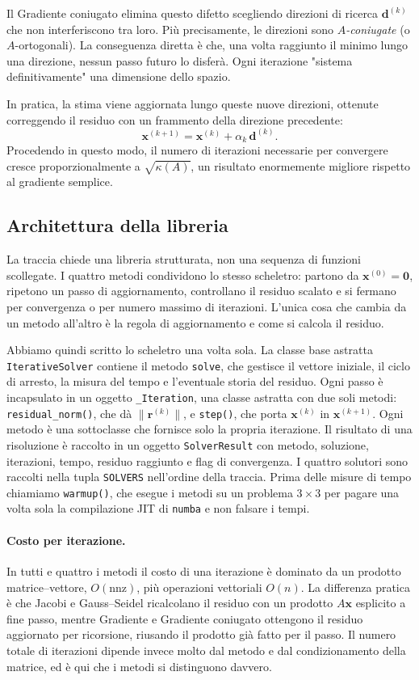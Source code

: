 \documentclass[11pt,a4paper]{article}
\begin{document}
Il Gradiente coniugato elimina questo difetto scegliendo direzioni di ricerca
$\mathbf{d}^{(k)}$ che non interferiscono tra loro. Più precisamente, le
direzioni sono \emph{$A$-coniugate} (o $A$-ortogonali). La conseguenza diretta
è che, una volta raggiunto il minimo lungo una direzione, nessun passo futuro
lo disferà. Ogni iterazione "sistema definitivamente" una dimensione dello
spazio.

In pratica, la stima viene aggiornata lungo queste nuove direzioni, ottenute
correggendo il residuo con un frammento della direzione precedente:
\[
\mathbf{x}^{(k+1)}=\mathbf{x}^{(k)}+\alpha_k\,\mathbf{d}^{(k)}.
\]
Procedendo in questo modo, il numero di iterazioni necessarie per convergere
cresce proporzionalmente a $\sqrt{\kappa(A)}$, un risultato enormemente
migliore rispetto al gradiente semplice.

\subsection{Architettura della libreria}
La traccia chiede una libreria strutturata, non una sequenza di funzioni scollegate.
I quattro metodi condividono lo stesso scheletro: partono da $\mathbf{x}^{(0)}=\mathbf{0}$,
ripetono un passo di aggiornamento, controllano il residuo scalato
e si fermano per convergenza o per numero massimo di iterazioni. L'unica cosa che
cambia da un metodo all'altro è la regola di aggiornamento e come si calcola il
residuo.

Abbiamo quindi scritto lo scheletro una volta sola. La classe base astratta
\texttt{IterativeSolver} contiene il metodo \texttt{solve}, che gestisce il
vettore iniziale, il ciclo di arresto, la misura del tempo e l'eventuale storia
del residuo. Ogni passo è incapsulato in un oggetto \texttt{\_Iteration}, una
classe astratta con due soli metodi: \texttt{residual\_norm()}, che dà
$\|\mathbf{r}^{(k)}\|$, e \texttt{step()}, che porta $\mathbf{x}^{(k)}$ in
$\mathbf{x}^{(k+1)}$. Ogni metodo è una sottoclasse che fornisce solo la propria
iterazione. Il risultato di una risoluzione è raccolto in un oggetto
\texttt{SolverResult} con metodo, soluzione, iterazioni, tempo, residuo
raggiunto e flag di convergenza. I quattro solutori sono raccolti nella tupla
\texttt{SOLVERS} nell'ordine della traccia. Prima delle misure di tempo chiamiamo
\texttt{warmup()}, che esegue i metodi su un problema $3\times3$ per pagare una
volta sola la compilazione JIT di \texttt{numba} e non falsare i tempi.

\paragraph{Costo per iterazione.} In tutti e quattro i metodi il costo di una
iterazione è dominato da un prodotto matrice--vettore, $O(\text{nnz})$, più
operazioni vettoriali $O(n)$. La differenza pratica è che Jacobi e Gauss--Seidel
ricalcolano il residuo con un prodotto $A\mathbf{x}$ esplicito a fine passo,
mentre Gradiente e Gradiente coniugato ottengono il residuo aggiornato per
ricorsione, riusando il prodotto già fatto per il passo. Il numero totale di
iterazioni dipende invece molto dal metodo e dal condizionamento della matrice,
ed è qui che i metodi si distinguono davvero.
\end{document}
